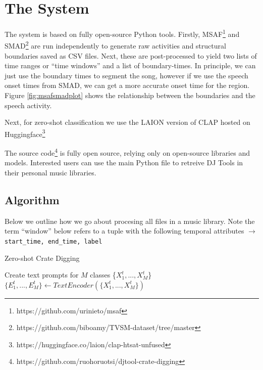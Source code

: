\documentclass{article}
\newcommand{\code}{\texttt}
\begin{document}
\section{The System}\label{sec:system}

The system is based on fully open-source Python tools. Firstly, MSAF\footnote{https://github.com/urinieto/msaf} and SMAD\footnote{https://github.com/biboamy/TVSM-dataset/tree/master} are run independently to generate raw activities and structural boundaries saved as CSV files. Next, these are post-processed to yield two lists of time ranges or ``time windows'' and a list of boundary-times. In principle, we can just use the boundary times to segment the song, however if we use the speech onset times from SMAD, we can get a more accurate onset time for the region. Figure \ref{fig:msafsmadplot} shows the relationship between the boundaries and the speech activity. 

Next, for zero-shot classification we use the LAION version of CLAP hosted on Huggingface\footnote{https://huggingface.co/laion/clap-htsat-unfused}

The source code\footnote{https://github.com/ruohoruotsi/djtool-crate-digging} is fully open source, relying only on open-source libraries and models. Interested users can use the main Python file to retreive DJ Tools in their personal music libraries.


\subsection{Algorithm}\label{subsec:algo}
Below we outline how we go about procesing all files in a music library. Note the term ``window''  below refers to a tuple with the following temporal attributes $\rightarrow$ \code{start\_time, end\_time, label}

\begin{algorithm}
    \caption{Zero-shot Crate Digging}\label{combo_algo}
    	Create text prompts for $M$ classes \{$X^{t}_{1},...,X^{t}_{M}$\} \\
    	 $\{E^{t}_{1},...,E^{t}_{M}\} \gets TextEncoder(\{X^{t}_{1},...,X^{t}_{M}\})$ \\
		\BlankLine

\end{algorithm}
\end{document}

